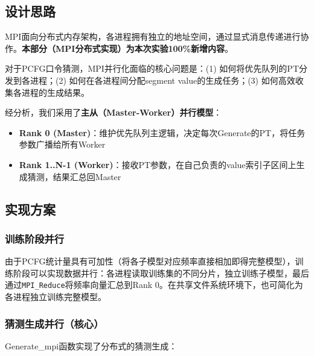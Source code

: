 \documentclass[12pt,a4paper]{ctexart}
\begin{document}
\subsection{设计思路}

MPI面向分布式内存架构，各进程拥有独立的地址空间，通过显式消息传递进行协作。\textbf{本部分（MPI分布式实现）为本次实验100\%新增内容}。

对于PCFG口令猜测，MPI并行化面临的核心问题是：(1) 如何将优先队列的PT分发到各进程；(2) 如何在各进程间分配segment value的生成任务；(3) 如何高效收集各进程的生成结果。

经分析，我们采用了\textbf{主从（Master-Worker）并行模型}：

\begin{itemize}[nosep]
    \item \textbf{Rank 0 (Master)}：维护优先队列主逻辑，决定每次Generate的PT，将任务参数广播给所有Worker
    \item \textbf{Rank 1..N-1 (Worker)}：接收PT参数，在自己负责的value索引子区间上生成猜测，结果汇总回Master
\end{itemize}

\subsection{实现方案}

\subsubsection{训练阶段并行}

由于PCFG统计量具有可加性（将各子模型对应频率直接相加即得完整模型），训练阶段可以实现数据并行：各进程读取训练集的不同分片，独立训练子模型，最后通过\texttt{MPI\_Reduce}将频率向量汇总到Rank 0。在共享文件系统环境下，也可简化为各进程独立训练完整模型。

\subsubsection{猜测生成并行（核心）}

Generate\_mpi函数实现了分布式的猜测生成：
\end{document}
